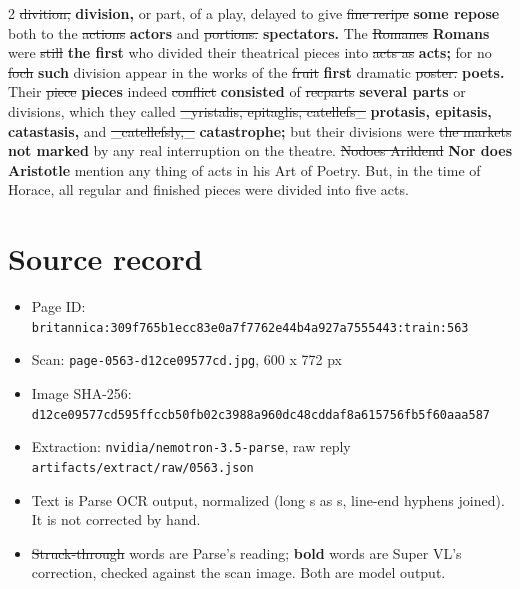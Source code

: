 \documentclass[10pt]{article}
\begin{document}
\begin{multicols}{2}
\sout{divition,} \textbf{division,} or part, of a play, delayed to give \sout{fine reripe} \textbf{some repose} both to the \sout{actions} \textbf{actors} and \sout{portions.} \textbf{spectators.} The \sout{Romanes} \textbf{Romans} were \sout{still} \textbf{the first} who divided their theatrical pieces into \sout{acts as} \textbf{acts;} for no \sout{foch} \textbf{such} division appear in the works of the \sout{fruit} \textbf{first} dramatic \sout{poster.} \textbf{poets.} Their \sout{piece} \textbf{pieces} indeed \sout{conflict} \textbf{consisted} of \sout{recparts} \textbf{several parts} or divisions, which they called \sout{\_yristalis, epitaglis, catellefs\_} \textbf{protasis, epitasis, catastasis,} and \sout{\_catellefsly,\_} \textbf{catastrophe;} but their divisions were \sout{the markets} \textbf{not marked} by any real interruption on the theatre. \sout{Nodoes Arildend} \textbf{Nor does Aristotle} mention any thing of acts in his Art of Poetry. But, in the time of Horace, all regular and finished pieces were divided into five acts.
\end{multicols}
\section*{Source record}
\begin{itemize}
\item Page ID: \texttt{britannica:309f765b1ecc83e0a7f7762e44b4a927a7555443:train:563}
\item Scan: \texttt{page-0563-d12ce09577cd.jpg}, 600 x 772 px
\item Image SHA-256: \texttt{\small d12ce09577cd595ffccb50fb02c3988a960dc48cddaf8a615756fb5f60aaa587}
\item Extraction: \texttt{nvidia/nemotron-3.5-parse}, raw reply \texttt{artifacts/extract/raw/0563.json}
\item Text is Parse OCR output, normalized (long s as s, line-end hyphens joined). It is not corrected by hand.
\item \sout{Struck-through} words are Parse's reading; \textbf{bold} words are Super VL's correction, checked against the scan image. Both are model output.
\end{itemize}
\end{document}

